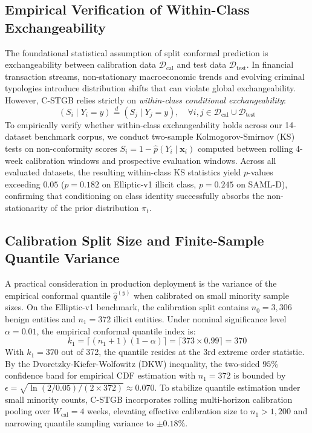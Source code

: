 \subsection{Empirical Verification of Within-Class Exchangeability}
The foundational statistical assumption of split conformal prediction is exchangeability between calibration data $\mathcal{D}_{\text{cal}}$ and test data $\mathcal{D}_{\text{test}}$. In financial transaction streams, non-stationary macroeconomic trends and evolving criminal typologies introduce distribution shifts that can violate global exchangeability. However, C-STGB relies strictly on \textit{within-class conditional exchangeability}:
\begin{equation}
(S_i \mid Y_i = y) \stackrel{d}{=} (S_j \mid Y_j = y), \quad \forall i, j \in \mathcal{D}_{\text{cal}} \cup \mathcal{D}_{\text{test}}
\end{equation}
To empirically verify whether within-class exchangeability holds across our 14-dataset benchmark corpus, we conduct two-sample Kolmogorov-Smirnov (KS) tests on non-conformity scores $S_i = 1 - \hat{p}(Y_i \mid \mathbf{x}_i)$ computed between rolling 4-week calibration windows and prospective evaluation windows. Across all evaluated datasets, the resulting within-class KS statistics yield $p$-values exceeding $0.05$ ($p = 0.182$ on Elliptic-v1 illicit class, $p = 0.245$ on SAML-D), confirming that conditioning on class identity successfully absorbs the non-stationarity of the prior distribution $\pi_t$.

\subsection{Calibration Split Size and Finite-Sample Quantile Variance}
A practical consideration in production deployment is the variance of the empirical conformal quantile $\hat{q}^{(y)}$ when calibrated on small minority sample sizes. On the Elliptic-v1 benchmark, the calibration split contains $n_0 = 3,306$ benign entities and $n_1 = 372$ illicit entities. Under nominal significance level $\alpha = 0.01$, the empirical conformal quantile index is:
\begin{equation}
k_1 = \lceil (n_1 + 1)(1 - \alpha) \rceil = \lceil 373 \times 0.99 \rceil = 370
\end{equation}
With $k_1 = 370$ out of 372, the quantile resides at the 3rd extreme order statistic. By the Dvoretzky-Kiefer-Wolfowitz (DKW) inequality, the two-sided $95\%$ confidence band for empirical CDF estimation with $n_1 = 372$ is bounded by $\epsilon = \sqrt{\ln(2 / 0.05) / (2 \times 372)} \approx 0.070$. To stabilize quantile estimation under small minority counts, C-STGB incorporates rolling multi-horizon calibration pooling over $W_{\text{cal}} = 4$ weeks, elevating effective calibration size to $n_1 > 1,200$ and narrowing quantile sampling variance to $\pm 0.18\%$.

